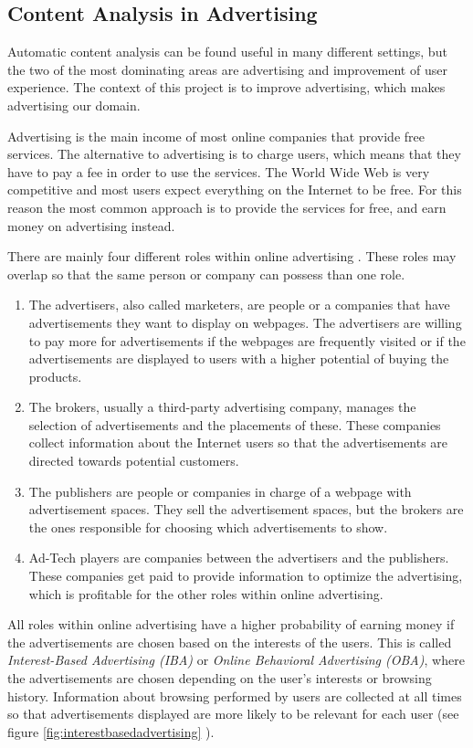\subsection{Content Analysis in Advertising}

Automatic content analysis can be found useful in many different settings, but the two of the most dominating areas are advertising and improvement of user experience. The context of this project is to improve advertising, which makes advertising our domain.

Advertising is the main income of most online companies that provide free services. The alternative to advertising is to charge users, which means that they have to pay a fee in order to use the services. The World Wide Web is very competitive and most users expect everything on the Internet to be free. For this reason the most common approach is to provide the services for free, and earn money on advertising instead. 

There are mainly four different roles within online advertising \cite{onlineadhowdoesitworks}. These roles may overlap so that the same person or company can possess than one role. 
\begin{enumerate}
\item The advertisers, also called marketers, are people or a companies that have advertisements they want to display on webpages. The advertisers are willing to pay more for advertisements if the webpages are frequently visited or if the advertisements are displayed to users with a higher potential of buying the products. 
\item The brokers, usually a third-party advertising company, manages the selection of advertisements and the placements of these. These companies collect information about the Internet users so that the advertisements are directed towards potential customers. 
\item The publishers are people or companies in charge of a webpage with advertisement spaces. They sell the advertisement spaces, but the brokers are the ones responsible for choosing which advertisements to show.
\item Ad-Tech players are companies between the advertisers and the publishers. These companies get paid to provide information to optimize the advertising, which is profitable for the other roles within online advertising. 

\end{enumerate}
All roles within online advertising have a higher probability of earning money if the advertisements are chosen based on the interests of the users. 
This is called \emph{Interest-Based Advertising (IBA)} or \emph{Online Behavioral Advertising (OBA)}, where the advertisements are chosen depending on the user's interests or browsing history. Information about browsing performed by users are collected at all times so that advertisements displayed are more likely to be relevant for each user (see figure \ref{fig:interestbasedadvertising} \cite{onlineadwhatisit}).

